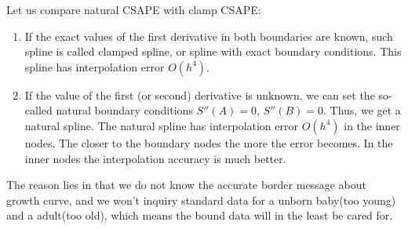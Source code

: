 \documentclass[
10pt, %
a4paper, %
oneside, %
headinclude,footinclude, %
BCOR5mm, %
]{scrartcl}
\begin{document}
Let us compare natural CSAPE with clamp CSAPE:
\begin{enumerate}
  \item If the exact values of the first derivative in both boundaries are known, such spline is called clamped spline, or spline with exact boundary conditions. This spline has interpolation error $O(h^4)$.
  \item If the value of the first (or second) derivative is unknown, we can set the so-called natural boundary conditions $S''(A)=0$, $S''(B)=0$. Thus, we get a natural spline. The natural spline has interpolation error $O(h^ 4)$ in the inner nodes. The closer to the boundary nodes the more the error becomes. In the inner nodes the interpolation accuracy is much better.
\end{enumerate}
The reason lies in that we do not know the accurate border message about growth curve, and we won't  inquiry standard data for a unborn baby(too young) and a adult(too old), which means the bound data will in the least be cared for.
\end{document}
